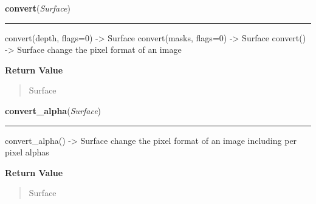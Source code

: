     \label{pygame:Surface:convert}

    \vspace{0.5ex}

\hspace{.8\funcindent}\begin{boxedminipage}{\funcwidth}

    \raggedright \textbf{convert}(\textit{Surface})

    \vspace{-1.5ex}

    \rule{\textwidth}{0.5\fboxrule}
\setlength{\parskip}{2ex}
    convert(depth, flags=0) -{\textgreater} Surface convert(masks, flags=0)
    -{\textgreater} Surface convert() -{\textgreater} Surface change the 
    pixel format of an image

\setlength{\parskip}{1ex}
      \textbf{Return Value}
    \vspace{-1ex}

      \begin{quote}
      Surface

      \end{quote}

    \end{boxedminipage}

    \label{pygame:Surface:convert_alpha}

    \vspace{0.5ex}

\hspace{.8\funcindent}\begin{boxedminipage}{\funcwidth}

    \raggedright \textbf{convert\_alpha}(\textit{Surface})

    \vspace{-1.5ex}

    \rule{\textwidth}{0.5\fboxrule}
\setlength{\parskip}{2ex}
    convert\_alpha() -{\textgreater} Surface change the pixel format of an 
    image including per pixel alphas

\setlength{\parskip}{1ex}
      \textbf{Return Value}
    \vspace{-1ex}

      \begin{quote}
      Surface

      \end{quote}

    \end{boxedminipage}

